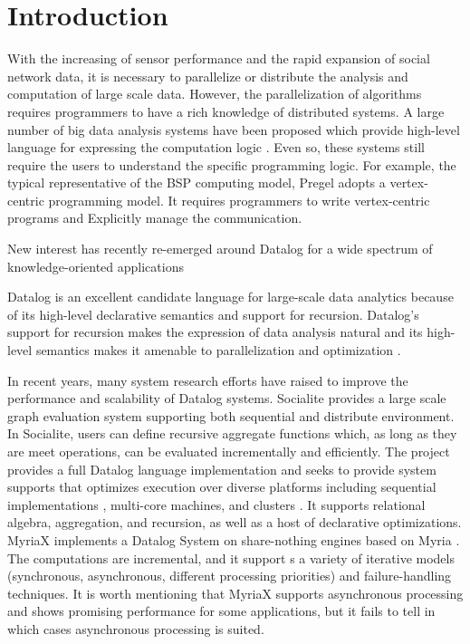 \section{Introduction}
With the increasing of sensor performance and the rapid expansion of social network data, it is necessary to parallelize or distribute the analysis and computation of large scale data. However, the parallelization of algorithms requires programmers to have a rich knowledge of distributed systems. A large number of big data analysis systems have been proposed which provide high-level language for expressing the computation logic \cite{}. Even so, these systems still require the users to understand the specific programming logic. For example, the typical representative of the BSP computing model, Pregel \cite{} adopts a vertex-centric programming model. It requires programmers to write vertex-centric programs and Explicitly manage the communication.

New interest has recently re-emerged around Datalog for a wide spectrum of knowledge-oriented applications \cite{}%

Datalog is an excellent candidate language for large-scale data analytics because of its high-level declarative semantics and support for recursion. Datalog's support for recursion makes the expression of data analysis natural \cite{} and its high-level semantics makes it amenable to parallelization and optimization \cite{}.


In recent years, many system research efforts have raised to improve the performance and scalability of Datalog systems. Socialite \cite{socialite} provides a large scale graph evaluation system supporting both sequential and distribute environment. In Socialite, users can define recursive aggregate functions which, as long as they are meet operations, can be evaluated incrementally and efficiently. The \cite{7113340} project provides a full Datalog language implementation and seeks to provide  system supports that optimizes execution over diverse platforms including sequential implementations \cite{Shkapsky:2016:BDA:2882903.2915229}, multi-core machines, and clusters \cite{bigdatalog}. It supports relational algebra, aggregation, and recursion, as well as a host of declarative optimizations. MyriaX \cite{Halperin:2014:DMB:2588555.2594530} implements a Datalog System on share-nothing engines based on Myria \cite{}. The computations are incremental, and it support s a variety of iterative models (synchronous, asynchronous, different processing priorities) and failure-handling techniques. It is worth mentioning that MyriaX supports asynchronous processing and shows promising performance for some applications, but it fails to tell in which cases asynchronous processing is suited.

